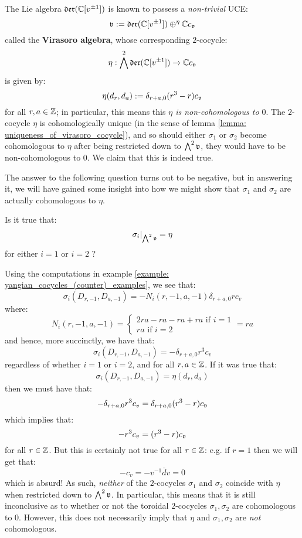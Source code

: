        The Lie algebra $\mathfrak{der}(\mathbb{C}[v^{\pm 1}])$ is known to possess a \textit{non-trivial} UCE:
            $$\mathfrak{v} := \mathfrak{der}(\mathbb{C}[v^{\pm 1}]) \oplus^{\eta} \mathbb{C} c_{\mathfrak{v}}$$
        called the \textbf{Virasoro algebra}, whose corresponding $2$-cocycle:
            $$\eta: \bigwedge^2 \mathfrak{der}(\mathbb{C}[v^{\pm 1}]) \to \mathbb{C} c_{\mathfrak{v}}$$
        is given by:
            $$\eta(d_r, d_a) := \delta_{r + a, 0} (r^3 - r) c_{\mathfrak{v}}$$
        for all $r, a \in \mathbb{Z}$; in particular, this means this \textit{$\eta$ is non-cohomologous to $0$}. The $2$-cocycle $\eta$ is cohomologically unique (in the sense of lemma \ref{lemma: uniqueness_of_virasoro_cocycle}), and so should either $\sigma_1$ or $\sigma_2$ become cohomologous to $\eta$ after being restricted down to $\bigwedge^2 \mathfrak{v}$, they would have to be non-cohomologous to $0$. We claim that this is indeed true.

        The answer to the following question turns out to be negative, but in answering it, we will have gained some insight into how we might show that $\sigma_1$ and $\sigma_2$ are actually cohomologous to $\eta$.
        \begin{question}
            Is it true that:
                $$\sigma_i|_{ \bigwedge^2 \mathfrak{v} } = \eta$$
            for either $i = 1$ or $i = 2$ ?
        \end{question}
        Using the computations in example \ref{example: yangian_cocycles_(counter)_examples}, we see that:
            $$\sigma_i(D_{r, -1}, D_{a, -1}) = -N_i(r, -1, a, -1) \delta_{r + a, 0} r c_v$$
        where:
            $$
                N_i(r, -1, a, -1) =
                \begin{cases}
                    \text{$2 ra - ra - ra + ra$ if $i = 1$}
                    \\
                    \text{$ra$ if $i = 2$}
                \end{cases}
                = ra
            $$
        and hence, more succinctly, we have that:
            $$\sigma_i(D_{r, -1}, D_{a, -1}) = -\delta_{r + a, 0} r^3 c_v$$
        regardless of whether $i = 1$ or $i = 2$, and for all $r, a \in \mathbb{Z}$. If it was true that:
            $$\sigma_i(D_{r, -1}, D_{a, -1}) = \eta(d_r, d_a)$$
        then we must have that:
            $$-\delta_{r + a, 0} r^3 c_v = \delta_{r + a, 0} (r^3 - r) c_{\mathfrak{v}}$$
        which implies that:
            $$-r^3 c_v = (r^3 - r) c_{\mathfrak{v}}$$
        for all $r \in \mathbb{Z}$. But this is certainly not true for all $r \in \mathbb{Z}$: e.g. if $r = 1$ then we will get that:
            $$-c_v = -v^{-1} \bar{d}v = 0$$
        which is absurd! As such, \textit{neither} of the $2$-cocycles $\sigma_1$ and $\sigma_2$ coincide with $\eta$ when restricted down to $\bigwedge^2 \mathfrak{v}$. In particular, this means that it is still inconclusive as to whether or not the toroidal $2$-cocycles $\sigma_1, \sigma_2$ are cohomologous to $0$. However, this does not necessarily imply that $\eta$ and $\sigma_1, \sigma_2$ are \textit{not} cohomologous. 

